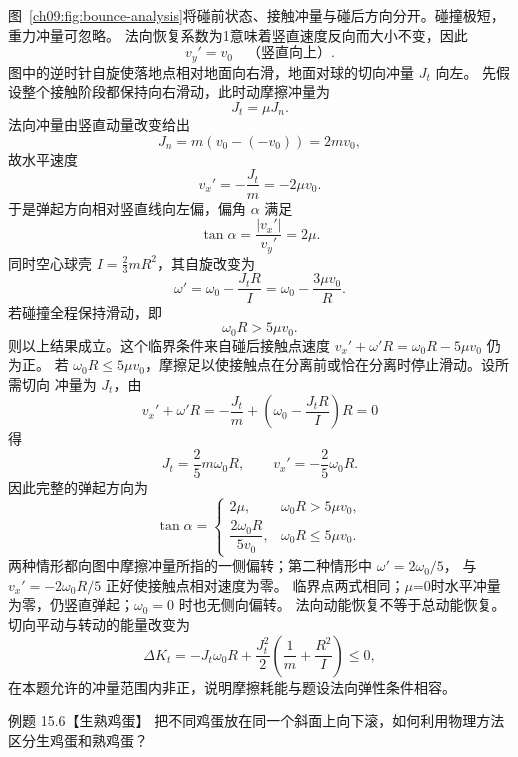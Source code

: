 \begin{xesolution}
图~\ref{ch09:fig:bounce-analysis}将碰前状态、接触冲量与碰后方向分开。碰撞极短，重力冲量可忽略。
\bounceSpinDiagram
法向恢复系数为1意味着竖直速度反向而大小不变，因此
\[
 v_y'=v_0 \quad\text{（竖直向上）}.
\]
图中的逆时针自旋使落地点相对地面向右滑，地面对球的切向冲量 $J_t$ 向左。
先假设整个接触阶段都保持向右滑动，此时动摩擦冲量为
\[
 J_t=\mu J_n.
\]
法向冲量由竖直动量改变给出
\[
 J_n=m(v_0-(-v_0))=2mv_0,
\]
故水平速度
\[
 \boxed{v_x'=-\frac{J_t}{m}=-2\mu v_0}.
\]
于是弹起方向相对竖直线向左偏，偏角 $\alpha$ 满足
\[
 \boxed{\tan\alpha=\frac{|v_x'|}{v_y'}=2\mu}.
\]
同时空心球壳 $I=\tfrac23mR^2$，其自旋改变为
\[
 \omega' =\omega_0-\frac{J_tR}{I}
 =\omega_0-\frac{3\mu v_0}{R}.
\]
若碰撞全程保持滑动，即
\[
 \omega_0R>5\mu v_0.
\]
则以上结果成立。这个临界条件来自碰后接触点速度
$v_x'+\omega'R=\omega_0R-5\mu v_0$ 仍为正。
若 $\omega_0R\leq5\mu v_0$，摩擦足以使接触点在分离前或恰在分离时停止滑动。设所需切向
冲量为 $J_t$，由
\[
 v_x'+\omega'R
 =-\frac{J_t}{m}+\left(\omega_0-\frac{J_tR}{I}\right)R=0
\]
得
\[
 J_t=\frac{2}{5}m\omega_0R,
 \qquad
 v_x'=-\frac25\omega_0R.
\]
因此完整的弹起方向为
\[
 \boxed{
 \tan\alpha=
 \begin{cases}
  2\mu, & \omega_0R>5\mu v_0,\\[2pt]
  \dfrac{2\omega_0R}{5v_0}, & \omega_0R\leq5\mu v_0.
 \end{cases}}
\]
两种情形都向图中摩擦冲量所指的一侧偏转；第二种情形中 $\omega'=2\omega_0/5$，
与 $v_x'=-2\omega_0R/5$ 正好使接触点相对速度为零。
临界点两式相同；$\mu$=0时水平冲量为零，仍竖直弹起；$\omega_0=0$ 时也无侧向偏转。
法向动能恢复不等于总动能恢复。切向平动与转动的能量改变为
\[
 \Delta K_t=-J_t\omega_0R+\frac{J_t^2}{2}\left(\frac1m+\frac{R^2}{I}\right)\le0,
\]
在本题允许的冲量范围内非正，说明摩擦耗能与题设法向弹性条件相容。
\end{xesolution}

\Needspace{0.33\textheight}
\begin{origexamplebox}{例题 15.6【生熟鸡蛋】}
把不同鸡蛋放在同一个斜面上向下滚，如何利用物理方法区分生鸡蛋和熟鸡蛋？
\eggRollingDiagram
\end{origexamplebox}

